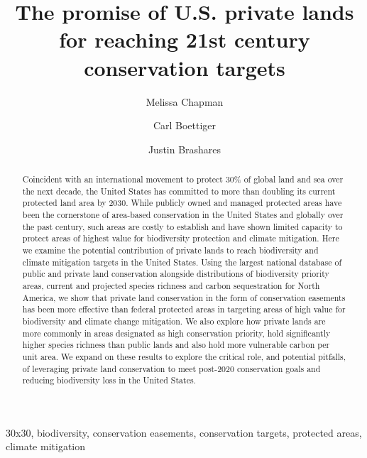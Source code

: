 \documentclass[3p]{elsarticle} %
\begin{document}
\begin{frontmatter}

  \title{The promise of U.S. private lands for reaching 21st century
conservation targets}
    \author[espm]{Melissa Chapman}
  
    \author[espm]{Carl Boettiger}
  
    \author[espm]{Justin Brashares}
  
      \address[espm]{Dept. of Environmental Science, Policy, and
Management, University of California Berkeley, Berkeley, CA, USA}
    
  \begin{abstract}
  Coincident with an international movement to protect 30\% of global
  land and sea over the next decade, the United States has committed to
  more than doubling its current protected land area by 2030. While
  publicly owned and managed protected areas have been the cornerstone
  of area-based conservation in the United States and globally over the
  past century, such areas are costly to establish and have shown
  limited capacity to protect areas of highest value for biodiversity
  protection and climate mitigation. Here we examine the potential
  contribution of private lands to reach biodiversity and climate
  mitigation targets in the United States. Using the largest national
  database of public and private land conservation alongside
  distributions of biodiversity priority areas, current and projected
  species richness and carbon sequestration for North America, we show
  that private land conservation in the form of conservation easements
  has been more effective than federal protected areas in targeting
  areas of high value for biodiversity and climate change mitigation. We
  also explore how private lands are more commonly in areas designated
  as high conservation priority, hold significantly higher species
  richness than public lands and also hold more vulnerable carbon per
  unit area. We expand on these results to explore the critical role,
  and potential pitfalls, of leveraging private land conservation to
  meet post-2020 conservation goals and reducing biodiversity loss in
  the United States.
  \end{abstract}
   \begin{keyword} 30x30, biodiversity, conservation
easements, conservation targets, protected areas, climate
mitigation\end{keyword}
 \end{frontmatter}
\end{document}
